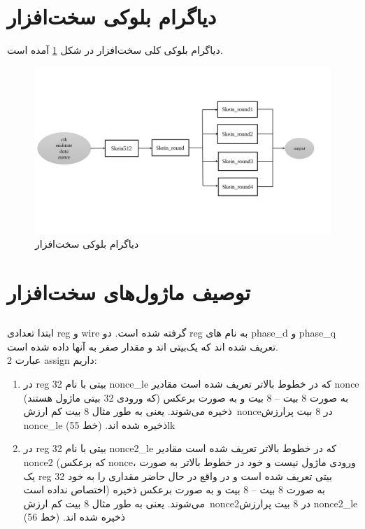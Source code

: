 \section{دیاگرام بلوکی سخت‌افزار}
دیاگرام بلوکی کلی سخت‌افزار در شکل 
\ref{block_diagram}
آمده است. 

\begin{figure}
\includegraphics[width = \textwidth]{figs/DescriptionOfSystem/block_diagram.jpg}
\caption{دیاگرام بلوکی سخت‌افزار}
\label{block_diagram}
\end{figure}

\section{توصیف ماژول‌های سخت‌افزار}
\subsection{}
ابتدا تعدادی reg و wire گرفته شده است.
دو reg به نام های phase\_d و phase\_q تعریف شده اند که یک‌بیتی اند و مقدار صفر به آنها داده شده است.\\
2 عبارت assign داریم: 

\begin{enumerate}
	\item در reg 32 بیتی با نام nonce\_le که در خطوط بالاتر تعریف شده است مقادیر nonce (که ورودی 32 بیتی ماژول هستند) به صورت 8 بیت – 8 بیت و به صورت برعکس ذخیره می‌شوند. یعنی به طور مثال 8 بیت کم ارزش\  nonceدر 8 بیت پرارزش nonce\_le ذخیره شده اند. (خط 55)lk\par

	\item در reg 32 بیتی با نام nonce2\_le که در خطوط بالاتر تعریف شده است مقادیر nonce2 (که برعکس nonce، ورودی ماژول نیست و خود در خطوط بالاتر به صورت یک reg 32 بیتی تعریف شده است و در واقع در حال حاضر مقداری را به خود اختصاص نداده است) به صورت 8 بیت – 8 بیت و به صورت برعکس ذخیره می‌شوند. یعنی به طور مثال 8 بیت کم ارزش\  nonce2در 8 بیت پرارزش nonce2\_le ذخیره شده اند. (خط 56)
\end{enumerate}

